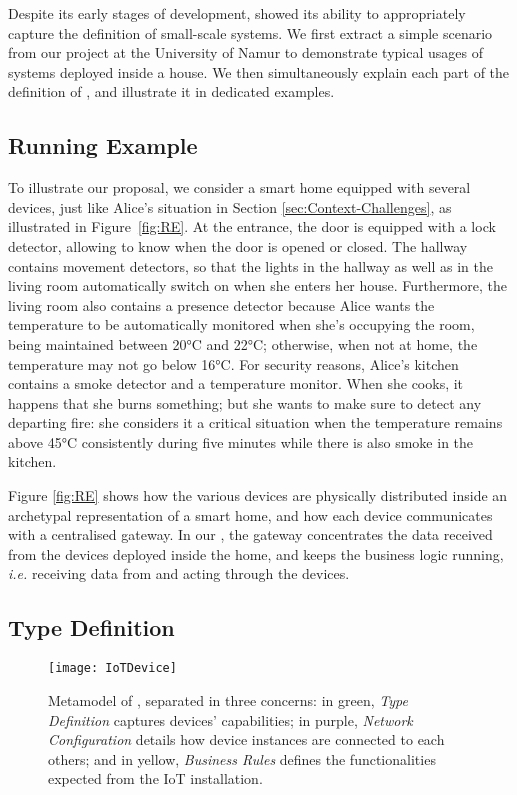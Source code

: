 Despite its early stages of development, \IOTDSL showed its ability to appropriately capture the definition of small-scale \IOT systems. We first extract a simple scenario from our project at the University of Namur to demonstrate typical usages of \IOT systems deployed inside a house. We then simultaneously explain each part of the definition of \IOTDSL, and illustrate it in dedicated examples.

\subsection{Running Example}
\label{sec:IoTDSL-Example}


To illustrate our proposal, we consider a smart home equipped with several devices, just like Alice's situation in Section \ref{sec:Context-Challenges}, as illustrated in Figure~\ref{fig:RE}. At the entrance, the door is equipped with a lock detector, allowing to know when the door is opened or closed. The hallway contains movement detectors, so that the lights in the hallway as well as in the living room automatically switch on when she enters her house. Furthermore, the living room also contains a presence detector because Alice wants the temperature to be automatically monitored when she's occupying the room, being maintained between 20°C and 22°C; otherwise, when not at home, the temperature may not go below 16°C. For security reasons, Alice's kitchen contains a smoke detector and a temperature monitor. When she cooks, it happens that she burns something; but she wants to make sure to detect any departing fire: she considers it a critical situation when the temperature remains above 45°C consistently during five minutes while there is also smoke in the kitchen. 

Figure \ref{fig:RE} shows how the various devices are physically distributed inside an archetypal representation of a smart home, and how each device communicates with a centralised gateway. In our \DSL, the gateway concentrates the data received from the devices deployed inside the home, and keeps the business logic running, \textit{i.e.} receiving data from and acting through the devices. 

\subsection{Type Definition}
\label{sec:IoTDSL-Type}

\begin{figure*}%
\texttt{[image: IoTDevice]}%
\caption{Metamodel of \IOTDSL, separated in three concerns: in green, \emph{Type Definition} captures devices' capabilities; in purple, \emph{Network Configuration} details how device instances are connected to each others; and in yellow, \emph{Business Rules} defines the functionalities expected from the IoT installation.}%
\label{fig:IoTDevice-MM}%
\end{figure*}

